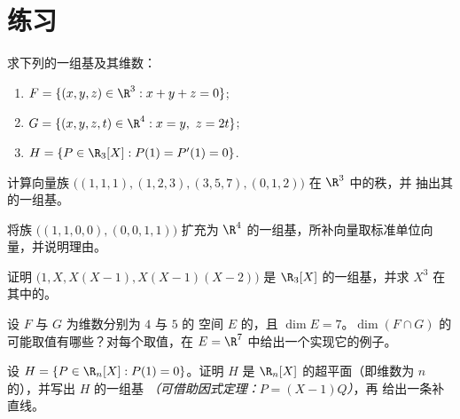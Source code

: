 \section{练习}

\begin{exercise}[$\star$]\label{exo:b1:findim:1}
求下列的一组基及其维数：
\begin{enumerate}
  \item $F = \{(x,y,z) \in \R^3 : x + y + z = 0\}$;
  \item $G = \{(x,y,z,t) \in \R^4 : x = y,\ z = 2t\}$;
  \item $H = \{P \in \R_3[X] : P(1) = P'(1) = 0\}$.
\end{enumerate}
\end{exercise}

\begin{exercise}[$\star$]\label{exo:b1:findim:2}
计算向量族
$\bigl((1,1,1), (1,2,3), (3,5,7), (0,1,2)\bigr)$ 在 $\R^3$ 中的秩，并
抽出其的一组基。
\end{exercise}

\begin{exercise}[$\star$]\label{exo:b1:findim:3}
将族 $\bigl((1,1,0,0), (0,0,1,1)\bigr)$ 扩充为
$\R^4$ 的一组基，所补向量取标准单位向量，并说明理由。
\end{exercise}

\begin{exercise}[$\star$]\label{exo:b1:findim:4}
证明 $\bigl(1, X, X(X-1), X(X-1)(X-2)\bigr)$ 是
$\R_3[X]$ 的一组基，并求 $X^3$ 在其中的。
\end{exercise}

\begin{exercise}[$\star\star$]\label{exo:b1:findim:5}
设 $F$ 与 $G$ 为维数分别为 $4$ 与 $5$ 的
空间 $E$ 的，且 $\dim E = 7$。$\dim(F \cap
G)$ 的可能取值有哪些？对每个取值，在 $E = \R^7$ 中给出一个实现它的例子。
\end{exercise}

\begin{exercise}[$\star\star$]\label{exo:b1:findim:6}
设 $H = \{P \in \R_n[X] : P(1) = 0\}$。证明 $H$ 是
$\R_n[X]$ 的超平面（即维数为 $n$ 的），并写出
$H$ 的一组基 \emph{（可借助因式定理：$P = (X-1)Q$）}，再
给出一条补直线。
\end{exercise}

